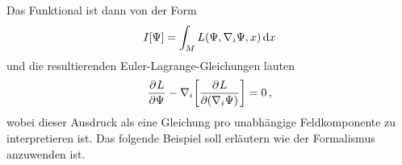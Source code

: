 Das Funktional ist dann von der Form
\begin{equation}
I[\Psi]=\int_M L\left(\Psi,\nabla_i \Psi,x\right)\dif x
\end{equation}
und die resultierenden Euler-Lagrange-Gleichungen lauten
\begin{equation}
\dpd{L}{\Psi}
-\nabla_i\left[\dpd{L}{(\nabla_i\Psi)}\right]=0\,,
\end{equation}
wobei dieser Ausdruck als eine Gleichung pro
unabhängige Feldkomponente zu interpretieren ist. Das folgende Beispiel soll
erläutern wie der Formalismus anzuwenden ist.
